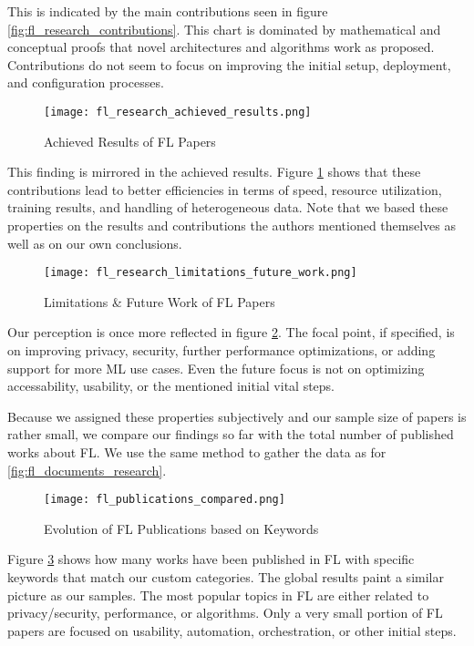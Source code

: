This is indicated by the main contributions seen in figure \ref{fig:fl_research_contributions}.
This chart is dominated by mathematical and conceptual proofs that novel
architectures and algorithms work as proposed.
Contributions do not seem to focus on improving the initial setup, deployment, and configuration processes.

\begin{figure}[h]
    \centering
    \texttt{[image: fl\_research\_achieved\_results.png]}
    \caption{Achieved Results of FL Papers}
    \label{fig:fl_research_achieved_results}
\end{figure}

This finding is mirrored in the achieved results.
Figure \ref{fig:fl_research_achieved_results} shows that these contributions
lead to better efficiencies in terms of speed, resource utilization, training results,
and handling of heterogeneous data.
Note that we based these properties on the results and contributions the authors mentioned themselves
as well as on our own conclusions.

\begin{figure}[h]
    \centering
    \texttt{[image: fl\_research\_limitations\_future\_work.png]}
    \caption{Limitations \& Future Work of FL Papers}
    \label{fig:fl_research_limitations_future_work}
\end{figure}

Our perception is once more reflected in figure \ref{fig:fl_research_limitations_future_work}.
The focal point, if specified, is on improving privacy, security, further performance optimizations, or adding support for more ML use cases.
Even the future focus is not on optimizing accessability, usability, or the mentioned initial vital steps.

Because we assigned these properties subjectively and our sample size of papers is rather small,
we compare our findings so far with the total number of published works about FL.
We use the same method to gather the data as for \ref{fig:fl_documents_research}.

\begin{figure}[H]
    \centering
    \texttt{[image: fl\_publications\_compared.png]}
    \caption{Evolution of FL Publications based on Keywords}
    \label{fig:fl_publications_compared}
\end{figure}


Figure \ref{fig:fl_publications_compared} shows how many works have been published in FL with
specific keywords that match our custom categories.
The global results paint a similar picture as our samples.
The most popular topics in FL are either related to privacy/security, performance,
or algorithms.
Only a very small portion of FL papers are focused on usability, automation, orchestration,
or other initial steps.

